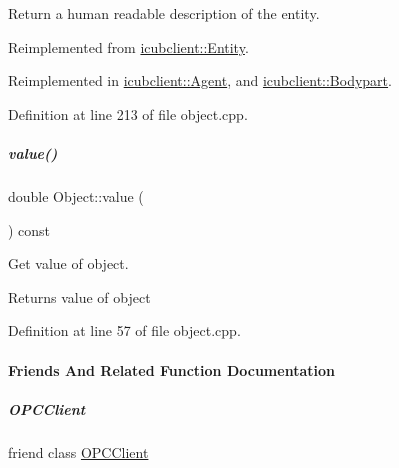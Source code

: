 Return a human readable description of the entity. 



Reimplemented from \hyperlink{group__icubclient__representations_ad578a93701121f00ac7079fafad6c0e1}{icubclient\+::\+Entity}.



Reimplemented in \hyperlink{group__icubclient__representations_a1fbd9d1acccac0b9fb5a6a1dce6f44f9}{icubclient\+::\+Agent}, and \hyperlink{group__icubclient__representations_ac14830acd5adc122c5caeb91947b9ca1}{icubclient\+::\+Bodypart}.



Definition at line 213 of file object.\+cpp.

\mbox{\label{group__icubclient__representations_aa60275afeab2678509b4288d4c0a7a42}} 
\subparagraph{\texorpdfstring{value()}{value()}}
{\footnotesize\ttfamily double Object\+::value (\begin{DoxyParamCaption}{ }\end{DoxyParamCaption}) const}



Get value of object. 

\begin{DoxyReturn}{Returns}
value of object 
\end{DoxyReturn}


Definition at line 57 of file object.\+cpp.



\paragraph{Friends And Related Function Documentation}
\mbox{\label{group__icubclient__representations_a80f0caa9925206967111a3d2713874a2}} 
\subparagraph{\texorpdfstring{O\+P\+C\+Client}{OPCClient}}
{\footnotesize\ttfamily friend class \hyperlink{group__icubclient__clients_classicubclient_1_1OPCClient}{O\+P\+C\+Client}\hspace{0.3cm}{\ttfamily [friend]}}



